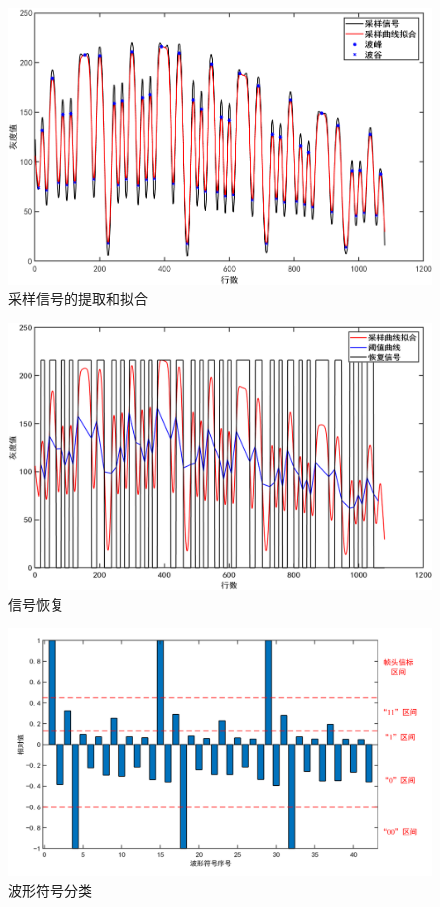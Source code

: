 \begin{figure}[!t]
  \centering
  \includegraphics[width=\linewidth]{FIG/samplecurve.png}
  \caption{采样信号的提取和拟合}
  \label{fig:curvefit}
\end{figure}


\begin{figure}[!htbp]
  \centering
  \includegraphics[width=\linewidth]{FIG/signalcurve.png}
  \caption{信号恢复}
  \label{fig:curverecovery}
\end{figure}


\begin{figure}[!htbp]
  \centering
  \includegraphics[width=0.9\linewidth]{FIG/curvedata.pdf}
  \caption{波形符号分类}
  \label{fig:curvedata}
\end{figure}

